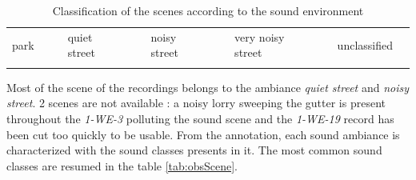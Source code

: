 \documentclass[a4,11pt,twocolumn]{article}
\begin{document}
\begin{table}[h]
\vspace{0.5cm}


\begin{tabular}{|p{1cm}|l|p{0.001cm}|p{2cm}|l|p{0.001cm}|p{2cm}|l|p{0.001cm}|p{2.75cm}|l|p{0.001cm}|p{2cm}|l|}

\hhline{|-|-|~|-|-|~|-|-|~|-|-|~|-|-|}
park & {\cellcolor[HTML]{5AB25A}} & & quiet street & {\cellcolor[HTML]{FFCB2F}} & & noisy street & {\cellcolor[HTML]{F56B00}} & &  very noisy street & {\cellcolor[HTML]{9A0000}} & & unclassified & \\
\hhline{|-|-|~|-|-|~|-|-|~|-|-|~|-|-|}

\end{tabular}


\caption{Classification of the scenes according to the sound environment}
\label{tab:classificationScene}
\end{table}

Most of the scene of the recordings belongs to the ambiance \textit{quiet street} and \textit{noisy street}. 2 scenes are not available : a noisy lorry sweeping the gutter is present throughout the \textit{1-WE-3} polluting the sound scene and the \textit{1-WE-19} record has been cut too quickly to be usable. From the annotation, each sound ambiance is characterized with the sound classes presents in it. The most common sound classes are resumed in the table \ref{tab:obsScene}.\\
\end{document}
